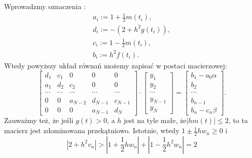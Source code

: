 Wprowadzmy oznaczenia :
\begin{align*}
a_i:= 1 + \frac{1}{2}m(t_i),\\
d_i:= -(2+h^2 g(t_i)), \\
c_i:= 1 - \frac{1}{2}m(t_i), \\
b_i:= h^2 f(t_i).
\end{align*}
Wtedy powyższy układ równań możemy zapisać w postaci macierzowej:
\begin{equation}\label{macierz}
\left[ \begin{array}{ccccc}
d_1 & c_1 & 0 & 0 & 0 \\
a_1 & d_2 & c_2 & 0 & 0\\
\cdots & \cdots & \cdots &\cdots  &\cdots \\
0 & 0 & a_{N-2} & d_{N-1} & c_{N-1}\\
0 & 0 & 0 & a_{N-1} & d_N 
\end{array} \right] \cdot
\left[ \begin{array}{c}
y_1 \\
y_2 \\
\cdots \\
y_{N-1} \\
y_{N}  
\end{array} \right] =
\left[ \begin{array}{c}
b_1 - a_0\alpha\\
b_2 \\
\cdots \\
b_{n-1} \\
b_n -c_n\beta 
\end{array} \right] .
\end{equation}
Zauważmy też, że jeśli $g(t)>0$, a $h$ jest na tyle małe, że$ |h m(t)| \leq 2$, to ta macierz jest zdominowana przekątniowo. Istotnie, wtedy $ 1 \pm \frac{1}{2}hw_n \geq 0 $ i
$$
|2 + h^2v_n| > |1 + \frac{1}{2}hw_n| + |1 - \frac{1}{2}h^2w_n| = 2
$$

